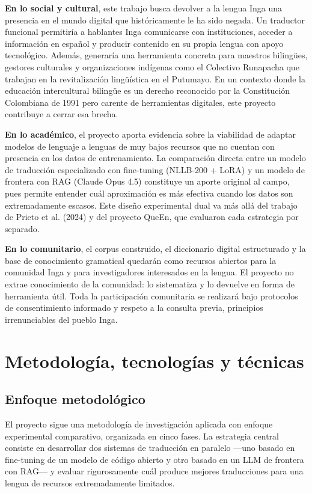 \documentclass[12pt,a4paper]{article}
\begin{document}
\textbf{En lo social y cultural}, este trabajo busca devolver a la lengua Inga una presencia en el mundo digital que históricamente le ha sido negada. Un traductor funcional permitiría a hablantes Inga comunicarse con instituciones, acceder a información en español y producir contenido en su propia lengua con apoyo tecnológico. Además, generaría una herramienta concreta para maestros bilingües, gestores culturales y organizaciones indígenas como el Colectivo Runapacha que trabajan en la revitalización lingüística en el Putumayo. En un contexto donde la educación intercultural bilingüe es un derecho reconocido por la Constitución Colombiana de 1991 pero carente de herramientas digitales, este proyecto contribuye a cerrar esa brecha.

\textbf{En lo académico}, el proyecto aporta evidencia sobre la viabilidad de adaptar modelos de lenguaje a lenguas de muy bajos recursos que no cuentan con presencia en los datos de entrenamiento. La comparación directa entre un modelo de traducción especializado con fine-tuning (NLLB-200 + LoRA) y un modelo de frontera con RAG (Claude Opus 4.5) constituye un aporte original al campo, pues permite entender cuál aproximación es más efectiva cuando los datos son extremadamente escasos. Este diseño experimental dual va más allá del trabajo de Prieto et al. (2024) y del proyecto QueEn, que evaluaron cada estrategia por separado.

\textbf{En lo comunitario}, el corpus construido, el diccionario digital estructurado y la base de conocimiento gramatical quedarán como recursos abiertos para la comunidad Inga y para investigadores interesados en la lengua. El proyecto no extrae conocimiento de la comunidad: lo sistematiza y lo devuelve en forma de herramienta útil. Toda la participación comunitaria se realizará bajo protocolos de consentimiento informado y respeto a la consulta previa, principios irrenunciables del pueblo Inga.

\section{Metodología, tecnologías y técnicas}

\subsection{Enfoque metodológico}

El proyecto sigue una metodología de investigación aplicada con enfoque experimental comparativo, organizada en cinco fases. La estrategia central consiste en desarrollar dos sistemas de traducción en paralelo ---uno basado en fine-tuning de un modelo de código abierto y otro basado en un LLM de frontera con RAG--- y evaluar rigurosamente cuál produce mejores traducciones para una lengua de recursos extremadamente limitados.
\end{document}

